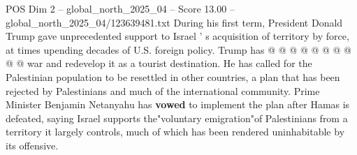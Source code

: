 \begin{textsample}{POS Dim 2 – global\_north\_2025\_04 – Score 13.00 – global\_north\_2025\_04/123639481.txt}
During his first term, President Donald Trump gave unprecedented support to Israel ' s acquisition of territory by force, at times upending decades of U.S. foreign policy.
Trump has @ @ @ @ @ @ @ @ @ @ war and redevelop it as a tourist destination.
He has called for the Palestinian population to be resettled in other countries, a plan that has been rejected by Palestinians and much of the international community.
Prime Minister Benjamin Netanyahu has \textbf{vowed} to implement the plan after Hamas is defeated, saying Israel supports the"voluntary emigration"of Palestinians from a territory it largely controls, much of which has been rendered uninhabitable by its offensive.

\end{textsample}
